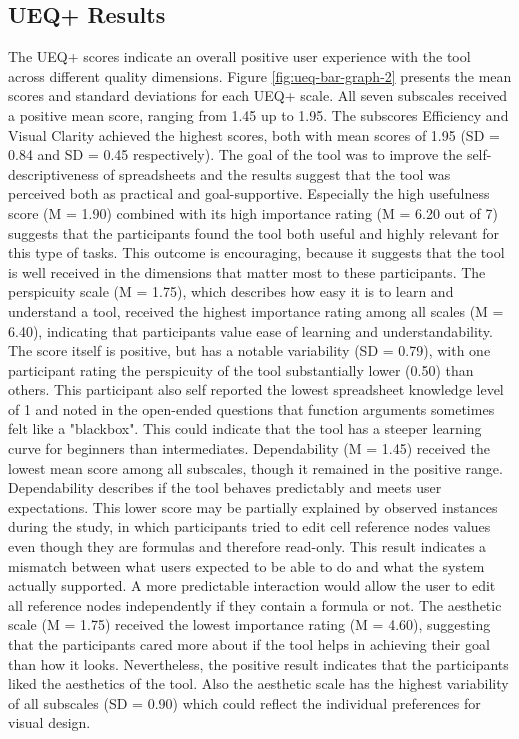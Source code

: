 \subsection{UEQ+ Results}

The UEQ+ scores indicate an overall positive user experience with the tool across different quality dimensions. Figure \ref{fig:ueq-bar-graph-2} presents the mean scores and standard deviations for each UEQ+ scale. All seven subscales received a positive mean score, ranging from 1.45 up to 1.95.
The subscores Efficiency and Visual Clarity achieved the highest scores, both with mean scores of 1.95 (SD = 0.84 and SD = 0.45 respectively). The goal of the tool was to improve the self-descriptiveness of spreadsheets and the results suggest that the tool was perceived both as practical and goal-supportive. Especially the high usefulness score (M = 1.90) combined with its high importance rating (M = 6.20 out of 7) suggests that the participants found the tool both useful and highly relevant for this type of tasks.
This outcome is encouraging, because it suggests that the tool is well received in the dimensions that matter most to these participants.
The perspicuity scale (M = 1.75), which describes how easy it is to learn and understand a tool, received the highest importance rating among all scales (M = 6.40), indicating that participants value ease of learning and understandability. The score itself is positive, but has a notable variability (SD = 0.79), with one participant rating the perspicuity of the tool substantially lower (0.50) than others. This participant also self reported the lowest spreadsheet knowledge level of 1 and noted in the open-ended questions that function arguments sometimes felt like a "blackbox". This could indicate that the tool has a steeper learning curve for beginners than intermediates.
Dependability (M = 1.45) received the lowest mean score among all subscales, though it remained in the positive range. Dependability describes if the tool behaves predictably and meets user expectations. This lower score may be partially explained by observed instances during the study, in which participants tried to edit cell reference nodes values even though they are formulas and therefore read-only. This result indicates a mismatch between what users expected to be able to do and what the system actually supported. A more predictable interaction would allow the user to edit all reference nodes independently if they contain a formula or not. %
The aesthetic scale (M = 1.75) received the lowest importance rating (M = 4.60), suggesting that the participants cared more about if the tool helps in achieving their goal than how it looks. Nevertheless, the positive result indicates that the participants liked the aesthetics of the tool. Also the aesthetic scale has the highest variability of all subscales (SD = 0.90) which could reflect the individual preferences for visual design.



